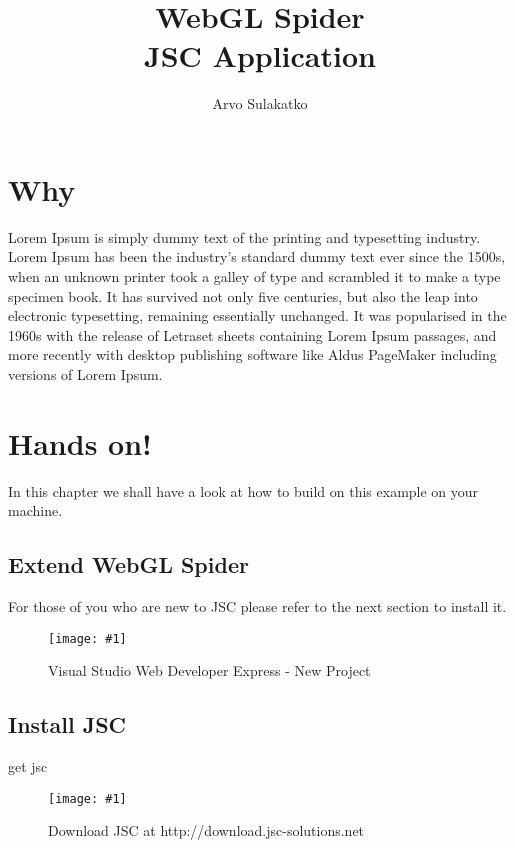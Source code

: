 \documentclass[12pt,leqno]{book}
\title{WebGL Spider\\ \large JSC Application}
\author{Arvo Sulakatko}
\newcommand{\png}[1]{\texttt{[image: \#1]}}
\newcommand{\figpng}[2]{\begin{figure}[htb]\centering\png{#1}\caption{#2}\end{figure}}
\begin{document}
\maketitle

\tableofcontents
\listoffigures

\chapter{Why}

Lorem Ipsum is simply dummy text of the printing and typesetting industry.  Lorem Ipsum has been the industry's standard dummy text ever since the 1500s, when an unknown printer took a galley of type and scrambled it to make a type specimen book. It has survived not only five centuries, but also the leap into electronic typesetting, remaining essentially unchanged. It was popularised in the 1960s with the release of Letraset sheets containing Lorem Ipsum passages, and more recently with desktop publishing software like Aldus PageMaker including versions of Lorem Ipsum.

\chapter{Hands on!}
In this chapter we shall have a look at how to build on this example on your machine. 

\section{Extend WebGL Spider}
For those of you who are new to JSC please refer to the next section to install it.

\figpng{Images/New_Project-2012-03-13_09.19.10}
{Visual Studio Web Developer Express - New Project}

\section{Install JSC}

get jsc

\figpng{Images/jsc_-_Google_Chrome-2012-03-14_14.33.04}
{Download JSC at http://download.jsc-solutions.net}
\end{document}
